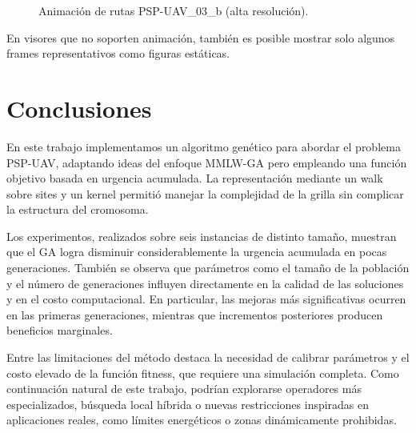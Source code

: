 \documentclass[11pt,a4paper]{article}
\begin{document}
\begin{figure}[H]
    \centering
    \caption{Animación de rutas PSP-UAV\_03\_b (alta resolución).}
    \label{fig:animacion01a}
\end{figure}

En visores que no soporten animación, también es posible mostrar solo algunos frames representativos como figuras estáticas.

\newpage


\section{Conclusiones}
\label{sec:conclusiones}

En este trabajo implementamos un algoritmo genético para abordar el problema PSP-UAV, adaptando ideas del enfoque MMLW-GA \cite{mmlwga2023} pero empleando una función objetivo basada en urgencia acumulada. La representación mediante un walk sobre sites y un kernel permitió manejar la complejidad de la grilla sin complicar la estructura del cromosoma.

Los experimentos, realizados sobre seis instancias de distinto tamaño, muestran que el GA logra disminuir considerablemente la urgencia acumulada en pocas generaciones. También se observa que parámetros como el tamaño de la población y el número de generaciones influyen directamente en la calidad de las soluciones y en el costo computacional. En particular, las mejoras más significativas ocurren en las primeras generaciones, mientras que incrementos posteriores producen beneficios marginales.

Entre las limitaciones del método destaca la necesidad de calibrar parámetros y el costo elevado de la función fitness, que requiere una simulación completa. Como continuación natural de este trabajo, podrían explorarse operadores más especializados, búsqueda local híbrida o nuevas restricciones inspiradas en aplicaciones reales, como límites energéticos o zonas dinámicamente prohibidas.





\end{document}
